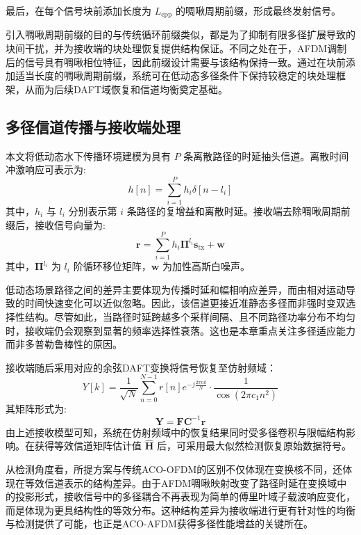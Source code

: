 最后，在每个信号块前添加长度为 $L_{\mathrm{cpp}}$ 的啁啾周期前缀，形成最终发射信号。

引入啁啾周期前缀的目的与传统循环前缀类似，都是为了抑制有限多径扩展导致的块间干扰，并为接收端的块处理恢复提供结构保证。不同之处在于，AFDM调制后的信号具有啁啾相位特征，因此前缀设计需要与该结构保持一致。通过在块前添加适当长度的啁啾周期前缀，系统可在低动态多径条件下保持较稳定的块处理框架，从而为后续DAFT域恢复和信道均衡奠定基础。

\subsection{多径信道传播与接收端处理}
\label{subsec:aco_afdm_rx}

本文将低动态水下传播环境建模为具有 $P$ 条离散路径的时延抽头信道\cite{kaushalUnderwaterOpticalWireless2016a}。离散时间冲激响应可表示为:
\begin{equation}
    h[n] = \sum_{i=1}^{P} h_i \delta[n-l_i]
\end{equation}
其中，$h_i$ 与 $l_i$ 分别表示第 $i$ 条路径的复增益和离散时延。接收端去除啁啾周期前缀后，接收信号向量为:
\begin{equation}
    \mathbf{r} = \sum_{i=1}^{P} h_i \boldsymbol{\Pi}^{l_i}\mathbf{s}_{\mathrm{tx}} + \mathbf{w}
\end{equation}
其中，$\boldsymbol{\Pi}^{l_i}$ 为 $l_i$ 阶循环移位矩阵，$\mathbf{w}$ 为加性高斯白噪声。

低动态场景路径之间的差异主要体现为传播时延和幅相响应差异，而由相对运动导致的时间快速变化可以近似忽略。因此，该信道更接近准静态多径而非强时变双选择性结构。尽管如此，当路径时延跨越多个采样间隔、且不同路径功率分布不均匀时，接收端仍会观察到显著的频率选择性衰落。这也是本章重点关注多径适应能力而非多普勒鲁棒性的原因。

接收端随后采用对应的余弦DAFT变换将信号恢复至仿射频域：
\begin{equation}
    Y[k] = \frac{1}{\sqrt{N}} \sum_{n=0}^{N-1} r[n] e^{-j \frac{2\pi nk}{N}} \cdot \frac{1}{\cos(2\pi c_1 n^2)}
\end{equation}
其矩阵形式为:
\begin{equation}
    \mathbf{Y} = \mathbf{F}\mathbf{C}^{-1}\mathbf{r}
\end{equation}
由上述接收模型可知，系统在仿射频域中的恢复结果同时受多径卷积与限幅结构影响。在获得等效信道矩阵估计值 $\hat{\mathbf{H}}$ 后，可采用最大似然检测恢复原始数据符号。

从检测角度看，所提方案与传统ACO-OFDM的区别不仅体现在变换核不同，还体现在等效信道表示的结构差异。由于AFDM啁啾映射改变了路径时延在变换域中的投影形式，接收信号中的多径耦合不再表现为简单的傅里叶域子载波响应变化，而是体现为更具结构性的等效分布。这种结构差异为接收端进行更有针对性的均衡与检测提供了可能，也正是ACO-AFDM获得多径性能增益的关键所在。

